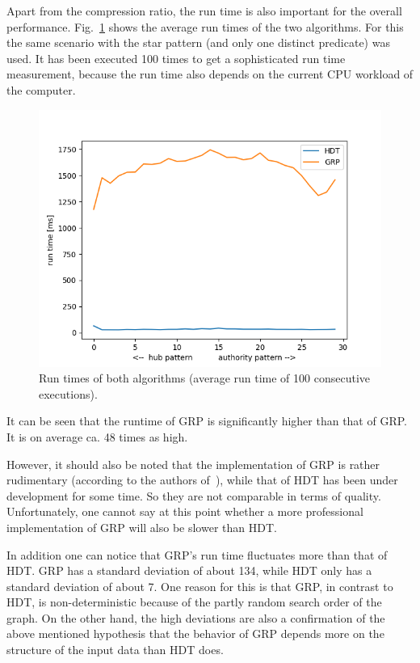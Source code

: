 Apart from the compression ratio, the run time is also important for the overall performance. Fig.~\ref{fig:runtimes} shows the average run times of the two algorithms. For this the same scenario with the star pattern (and only one distinct predicate) was used. It has been executed 100 times to get a sophisticated run time measurement, because the run time also depends on the current CPU workload of the computer.

\begin{figure}
	\centering
	\includegraphics[width=0.7\linewidth]{figures/GRPvsHDT/runtimes}
	\caption{Run times of both algorithms (average run time of 100 consecutive executions).}
	\label{fig:runtimes}
\end{figure}


It can be seen that the runtime of GRP is significantly higher than that of GRP. It is on average ca. 48 times as high.

However, it should also be noted that the implementation of GRP is rather rudimentary  (according to the authors of~\cite{maneth}), while that of HDT has been under development for some time. So they are not comparable in terms of quality. Unfortunately, one cannot say at this point whether a more professional implementation of GRP will also be slower than HDT.

In addition one can notice that GRP's run time fluctuates more than that of HDT. GRP has a standard deviation of about 134, while HDT only has a standard deviation of about 7. One reason for this is that GRP, in contrast to HDT, is non-deterministic because of the partly random search order of the graph. On the other hand, the high deviations are also a confirmation of the above mentioned hypothesis that the behavior of GRP depends more on the structure of the input data than HDT does.



